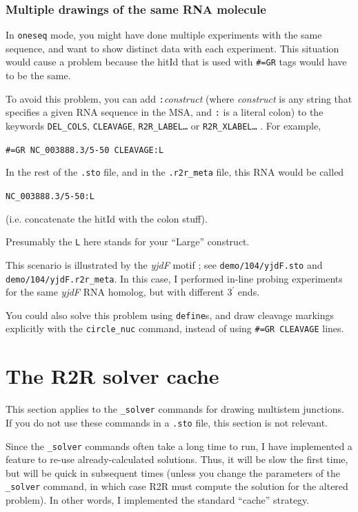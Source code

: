 \documentclass[letterpaper,12pt]{report}
\begin{document}
\subsubsection{Multiple drawings of the same RNA molecule}

In {\tt oneseq} mode, you might have done multiple experiments with the same sequence, and want to show distinct data with each experiment.
This situation would cause a problem because the hitId that is used with {\tt \#=GR} tags would have to be the same.  

To avoid this problem,
you can add {\tt :}\textit{construct}
(where \textit{construct} is any string that specifies a given
RNA sequence in the MSA, and {\tt :} is a literal colon)
to the keywords {\tt DEL\_COLS}, {\tt CLEAVAGE}, {\tt R2R\_LABEL{\dots}} or
{\tt R2R\_XLABEL{\dots}} .  For example,

{\tt \#=GR NC\_003888.3/5-50 CLEAVAGE:L}

In the rest of the {\tt .sto} file, and in the {\tt .r2r\_meta} file, this RNA would
be called

{\tt NC\_003888.3/5-50:L}

(i.e. concatenate the hitId with the colon stuff).

Presumably the {\tt L} here stands for your
``Large'' construct.

This scenario is illustrated by the {\it yjdF} motif \cite{Weinberg104Motifs}; see {\tt demo/104/yjdF.sto} and {\tt demo/104/yjdF.r2r\_meta}.  In this case, I performed in-line probing experiments for the same {\it yjdF} RNA homolog, but with different $3^\prime$ ends.

You could also solve this problem using {\tt define}s, and draw cleavage markings explicitly
with the {\tt circle\_nuc} command, instead of using {\tt \#=GR CLEAVAGE} lines.

\section{The R2R solver cache}

This section applies to the {\tt \_solver} commands for drawing multistem junctions.  If you do not use these commands in a {\tt .sto} file, this section is not relevant.

Since the {\tt \_solver} commands often take a long time to run, I have implemented a feature to re-use already-calculated solutions.  Thus, it will be slow the first time, but will be quick in subsequent times (unless you change the parameters of the {\tt \_solver} command, in which case R2R must compute the solution for the altered problem).  In other words, I implemented the standard ``cache'' strategy.
\end{document}

